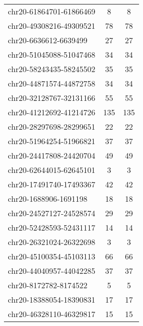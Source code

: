 \begin{longtable}{lSS}
	chr20-61864701-61866469 & 8      & 8                                         \\
	chr20-49308216-49309521 & 78     & 78                                        \\
	chr20-6636612-6639499   & 27     & 27                                        \\
	chr20-51045088-51047468 & 34     & 34                                        \\
	chr20-58243435-58245502 & 35     & 35                                        \\
	chr20-44871574-44872758 & 34     & 34                                        \\
	chr20-32128767-32131166 & 55     & 55                                        \\
	chr20-41212692-41214726 & 135    & 135                                       \\
	chr20-28297698-28299651 & 22     & 22                                        \\
	chr20-51964254-51966821 & 37     & 37                                        \\
	chr20-24417808-24420704 & 49     & 49                                        \\
	chr20-62644015-62645101 & 3      & 3                                         \\
	chr20-17491740-17493367 & 42     & 42                                        \\
	chr20-1688906-1691198   & 18     & 18                                        \\
	chr20-24527127-24528574 & 29     & 29                                        \\
	chr20-52428593-52431117 & 14     & 14                                        \\
	chr20-26321024-26322698 & 3      & 3                                         \\
	chr20-45100354-45103113 & 66     & 66                                        \\
	chr20-44040957-44042285 & 37     & 37                                        \\
	chr20-8172782-8174522   & 5      & 5                                         \\
	chr20-18388054-18390831 & 17     & 17                                        \\
	chr20-46328110-46329817 & 15     & 15                                        \\

\end{longtable}
